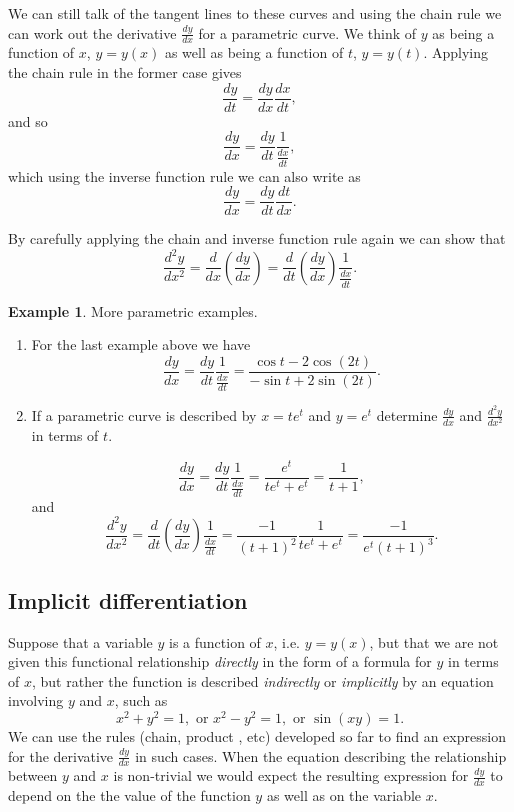 \documentclass[extrafontsizes, twoside, a4paper]{memoir}
\theoremstyle{plain}%
\theoremstyle{definition}
\newtheorem{exmp}{Example}[chapter]
\theoremstyle{remark}
\begin{document}
We can still talk of the tangent lines to these curves and using the chain rule we can work out the derivative $\frac{dy}{dx}$ for a parametric curve. We think of $y$ as being a function of $x$, $y=y(x)$ as well as being a function of $t$, $y=y(t)$. Applying the chain rule in the former case gives
$$\frac{dy}{dt} = \frac{dy}{dx} \frac{dx}{dt},$$
and so
$$\frac{dy}{dx} = \frac{dy}{dt} \frac{1}{\frac{dx}{dt}},$$
which using the inverse function rule we can also write as
$$ \frac{dy}{dx} = \frac{dy}{dt} \frac{dt}{dx}.$$

By carefully applying the chain and inverse function rule again we can show that
$$\frac{d^2y}{dx^2} = \frac{d}{dx} \left ( \frac{dy}{dx} \right ) = \frac{d}{dt} \left ( \frac{dy}{dx} \right ) \frac{1}{\frac{dx}{dt}}.$$

\begin{exmp}
More parametric examples.
\begin{enumerate}
\item
For the last example above we have
$$\frac{dy}{dx} = \frac{dy}{dt} \frac{1}{\frac{dx}{dt}} = \frac{\cos{t} - 2 \cos{(2t)}}{-\sin{t} + 2 \sin{(2t)}} .$$
\item
If a parametric curve is described by $x=te^t$ and $y=e^t$ determine $\frac{dy}{dx}$ and $\frac{d^2 y}{dx^2}$ in terms of $t$.

$$\frac{dy}{dx} = \frac{dy}{dt} \frac{1}{\frac{dx}{dt}} = \frac{e^t}{te^t + e^t} = \frac{1}{t+1},$$
and
$$\frac{d^2y}{dx^2} = \frac{d}{dt} \left ( \frac{dy}{dx} \right ) \frac{1}{\frac{dx}{dt}} = \frac{-1}{(t+1)^2} \frac{1}{te^t + e^t} = \frac{-1}{e^t(t+1)^3}.$$
\end{enumerate}
\end{exmp}

\subsection{Implicit differentiation}
Suppose that a variable $y$ is a function of $x$, i.e. $y=y(x)$, but that we are not given this functional relationship \emph{directly} in the form of a formula for $y$ in terms of $x$, but rather the function is described \emph{indirectly} or \emph{implicitly} by an equation involving $y$ and $x$, such as
$$x^2 + y^2 = 1, \text{ or } x^2 - y^2 = 1, \text{ or } \sin{(xy)}=1 .$$
We can use the rules (chain, product , etc) developed so far to find an expression for the derivative $\frac{dy}{dx}$ in such cases. When the equation describing the relationship between $y$ and $x$ is non-trivial we would expect the resulting expression for $\frac{dy}{dx}$ to depend on the the value of the function $y$ as well as on the variable $x$.
\end{document}
